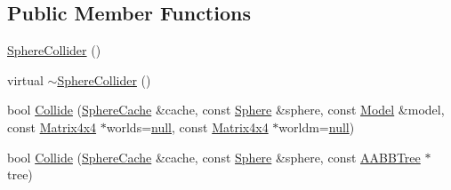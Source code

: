 \subsection*{Public Member Functions}
\begin{DoxyCompactItemize}
\item 
\hyperlink{classOpcode_1_1SphereCollider_af46ca28e45d8efa559f097aadfb9bc44}{Sphere\+Collider} ()
\item 
virtual \hyperlink{classOpcode_1_1SphereCollider_ac3f355cae4d6cbd988bf7b4ea74b5472}{$\sim$\+Sphere\+Collider} ()
\item 
bool \hyperlink{classOpcode_1_1SphereCollider_ad5c6c1a0fb1ea0377b5d6a89a8b5c54b}{Collide} (\hyperlink{structOpcode_1_1SphereCache}{Sphere\+Cache} \&cache, const \hyperlink{classOpcode_1_1Sphere}{Sphere} \&sphere, const \hyperlink{classOpcode_1_1Model}{Model} \&model, const \hyperlink{classOpcode_1_1Matrix4x4}{Matrix4x4} $\ast$worlds=\hyperlink{IceTypes_8h_ac97b8ee753e4405397a42ad5799b0f9e}{null}, const \hyperlink{classOpcode_1_1Matrix4x4}{Matrix4x4} $\ast$worldm=\hyperlink{IceTypes_8h_ac97b8ee753e4405397a42ad5799b0f9e}{null})
\item 
bool \hyperlink{classOpcode_1_1SphereCollider_a3f0d0ed9663d0c39c75f54b4ed4568ce}{Collide} (\hyperlink{structOpcode_1_1SphereCache}{Sphere\+Cache} \&cache, const \hyperlink{classOpcode_1_1Sphere}{Sphere} \&sphere, const \hyperlink{classOpcode_1_1AABBTree}{A\+A\+B\+B\+Tree} $\ast$tree)
\end{DoxyCompactItemize}
